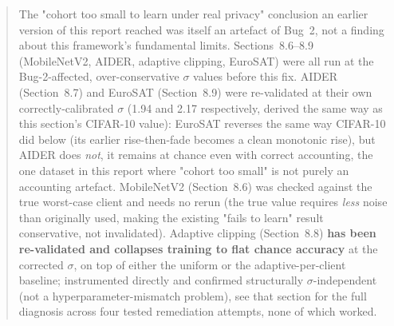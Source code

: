 \documentclass[12pt,a4paper]{article}
\begin{document}
\begin{quote}
The "cohort too small to learn under real privacy" conclusion an earlier
version of this report reached was itself an artefact of Bug~2, not a
finding about this framework's fundamental limits. Sections~8.6--8.9
(MobileNetV2, AIDER, adaptive clipping, EuroSAT) were all run at the
Bug-2-affected, over-conservative $\sigma$ values before this fix. AIDER
(Section~8.7) and EuroSAT (Section~8.9) were re-validated at their own
correctly-calibrated $\sigma$ (1.94 and 2.17 respectively, derived the
same way as this section's CIFAR-10 value): EuroSAT reverses the same way
CIFAR-10 did below (its earlier rise-then-fade becomes a clean monotonic
rise), but AIDER does \emph{not}, it remains at chance even with correct
accounting, the one dataset in this report where "cohort too small" is
not purely an accounting artefact. MobileNetV2 (Section~8.6) was checked
against the true worst-case client and needs no rerun (the true value
requires \emph{less} noise than originally used, making the existing
"fails to learn" result conservative, not invalidated). Adaptive
clipping (Section~8.8) \textbf{has been re-validated and collapses
training to flat chance accuracy} at the corrected $\sigma$, on top of
either the uniform or the adaptive-per-client baseline; instrumented
directly and confirmed structurally $\sigma$-independent (not a
hyperparameter-mismatch problem), see that section for the full
diagnosis across four tested remediation attempts, none of which
worked.


\end{quote}
\end{document}
